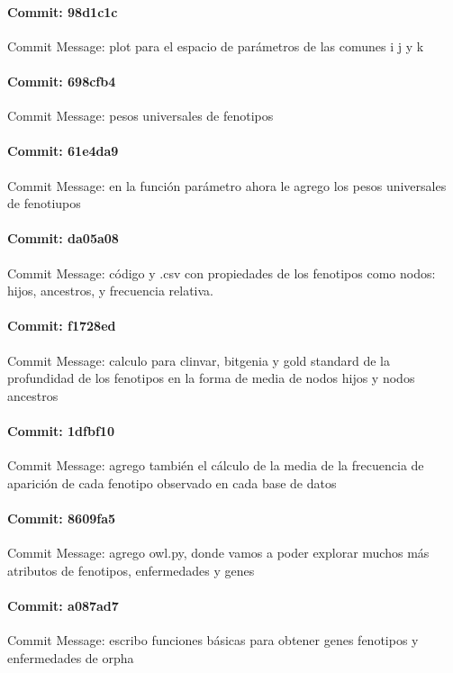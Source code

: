 \documentclass{article}
\begin{document}
\paragraph{Commit: 98d1c1c}
Commit Message: plot para el espacio de parámetros de las comunes i j y k

\paragraph{Commit: 698cfb4}
Commit Message: pesos universales de fenotipos

\paragraph{Commit: 61e4da9}
Commit Message: en la función parámetro ahora le agrego los pesos universales de fenotiupos

\paragraph{Commit: da05a08}
Commit Message: código y .csv con propiedades de los fenotipos como nodos: hijos, ancestros, y frecuencia relativa.

\paragraph{Commit: f1728ed}
Commit Message: calculo para clinvar, bitgenia y gold standard de la profundidad de los fenotipos en la forma de media de nodos hijos y nodos ancestros

\paragraph{Commit: 1dfbf10}
Commit Message: agrego también el cálculo de la media de la frecuencia de aparición de cada fenotipo observado en cada base de datos

\paragraph{Commit: 8609fa5}
Commit Message: agrego owl.py, donde vamos a poder explorar muchos más atributos de fenotipos, enfermedades y genes

\paragraph{Commit: a087ad7}
Commit Message: escribo funciones básicas para obtener genes fenotipos y enfermedades de orpha
\end{document}
